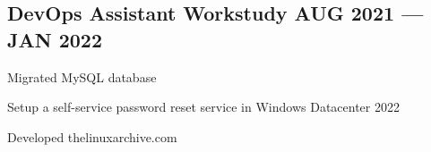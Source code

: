 \documentclass[letter,10pt]{article}
\begin{document}

\subsection{DevOps Assistant Workstudy \hfill AUG 2021 --- JAN 2022}
\begin{zitemize}
\item Migrated MySQL database
\item Setup a self-service password reset service in Windows Datacenter 2022
\item Developed thelinuxarchive.com
\end{zitemize}
\end{document}
